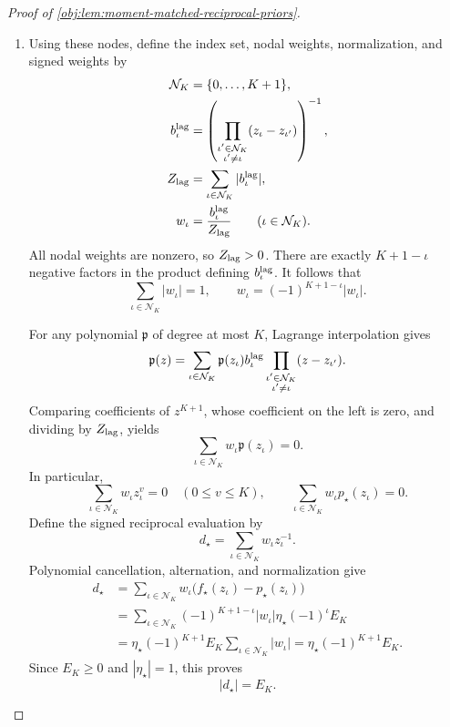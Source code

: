 \begin{proof}[Proof of \cref{obj:lem:moment-matched-reciprocal-priors}]
\begin{enumerate}
\item Using these nodes, define the index set, nodal weights, normalization, and signed weights by
\[
\begin{aligned}
\mathcal N_K&=\{0,\ldots,K+1\},\\
b_\iota^{\rm lag}
&=\left(\prod_{\substack{\iota'\in\mathcal N_K\\\iota'\ne\iota}}
(z_\iota-z_{\iota'})\right)^{-1},\\
Z_{\rm lag}&=\sum_{\iota\in\mathcal N_K}|b_\iota^{\rm lag}|,\\
w_\iota&=\frac{b_\iota^{\rm lag}}{Z_{\rm lag}}
\qquad(\iota\in\mathcal N_K).
\end{aligned}
\]
All nodal weights are nonzero, so \(Z_{\rm lag}>0\). There are exactly \(K+1-\iota\) negative factors in the product defining \(b_\iota^{\rm lag}\). It follows that
\[
\sum_{\iota\in\mathcal N_K}|w_\iota|=1,
\qquad
w_\iota=(-1)^{K+1-\iota}|w_\iota|.
\]

For any polynomial \(\mathfrak p\) of degree at most \(K\), Lagrange interpolation gives
\[
\mathfrak p(z)
=\sum_{\iota\in\mathcal N_K}
\mathfrak p(z_\iota)b_\iota^{\rm lag}
\prod_{\substack{\iota'\in\mathcal N_K\\\iota'\ne\iota}}
(z-z_{\iota'}).
\]
Comparing coefficients of \(z^{K+1}\), whose coefficient on the left is zero, and dividing by \(Z_{\rm lag}\), yields
\[
\sum_{\iota\in\mathcal N_K}w_\iota\mathfrak p(z_\iota)=0.
\]
In particular,
\[
\sum_{\iota\in\mathcal N_K}w_\iota z_\iota^v=0
\quad(0\le v\le K),
\qquad
\sum_{\iota\in\mathcal N_K}w_\iota p_\star(z_\iota)=0.
\]
Define the signed reciprocal evaluation by
\[
d_\star=\sum_{\iota\in\mathcal N_K}w_\iota z_\iota^{-1}.
\]
Polynomial cancellation, alternation, and normalization give
\[
\begin{aligned}
d_\star
&=\sum_{\iota\in\mathcal N_K}
  w_\iota\bigl(f_\star(z_\iota)-p_\star(z_\iota)\bigr)\\
&=\sum_{\iota\in\mathcal N_K}
  (-1)^{K+1-\iota}|w_\iota|
  \eta_\star(-1)^\iota E_K\\
&=\eta_\star(-1)^{K+1}E_K
  \sum_{\iota\in\mathcal N_K}|w_\iota|
=\eta_\star(-1)^{K+1}E_K.
\end{aligned}
\]
Since \(E_K\ge0\) and \(|\eta_\star|=1\), this proves
\[
|d_\star|=E_K.
\]


\end{enumerate}
\end{proof}

